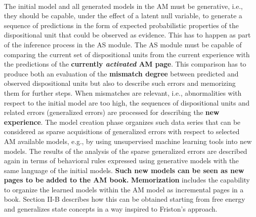 \documentclass{article}
\begin{document}
		\paragraph{}The initial model and all generated models in the AM must be generative, i.e., they should be capable, under the effect of a latent null variable, to generate a sequence of predictions in the form of expected probabilistic properties of the dispositional unit that could be observed as evidence. This has to happen as part of the inference process in the AS
		module. The AS module must be capable of comparing the current set of dispositional units from the current experience with the predictions of the \textbf{currently \emph{activated} AM page}. This comparison has to produce both an evaluation of the \textbf{mismatch degree} between predicted and observed dispositional units but also to describe such errors and memorizing them for further steps. When mismatches are relevant, i.e., abnormalities with respect to the initial model are too high, the sequences of dispositional units and related errors (generalized errors) are processed for describing the \textbf{new experience}. The model creation phase organizes such data series that can be considered
		as sparse acquisitions of generalized errors with respect to
		selected AM available models, e.g., by using unsupervised
		machine learning tools into new models. The results of the
		analysis of the sparse generalized errors are described again
		in terms of behavioral rules expressed using generative models
		with the same language of the initial models. \textbf{Such new models
		can be seen as new pages to be added to the AM book.}
		\textbf{Memorization} includes the capability to organize the learned
		models within the AM model as incremental pages in a book.
		\citet{regazzoni-2020-multi-sensorial-generative-and-descriptive-self-awareness-models-for-autonomous-systems} Section II-B describes how this can be obtained starting from
		free energy and generalizes state concepts in a way inspired
		to Friston’s approach.
\end{document}
